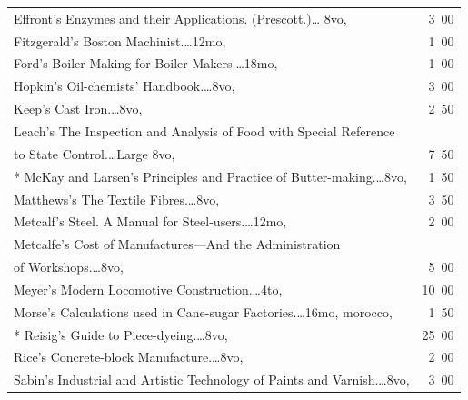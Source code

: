 \documentclass[a4paper,12pt]{book}[2004/02/16]
\theoremstyle{ilemma}
\theoremstyle{itheorem}
\theoremstyle{iother}
\theoremstyle{icorollary}
\theoremstyle{numcorollary}
\theoremstyle{idefinition}
\begin{document}
\begin{longtable}{@{}l@{ }r@{}}
Effront's Enzymes and their Applications. (Prescott.)\dotfill\ldots
8vo, &3\ 00\\

Fitzgerald's Boston Machinist.\dotfill\ldots 12mo, &1\ 00\\

Ford's Boiler Making for Boiler Makers.\dotfill\ldots 18mo, &1\ 00\\

Hopkin's Oil-chemists' Handbook.\dotfill\ldots 8vo, &3\ 00\\

Keep's Cast Iron.\dotfill\ldots 8vo, &2\ 50\\



Leach's The Inspection and Analysis of Food with Special Reference\\

\nopagebreak

\indent\indent to State Control.\dotfill\ldots Large 8vo, &7\ 50\\

* McKay and Larsen's Principles and Practice of
  Butter-making.\dotfill\ldots 8vo, &1\ 50\\

Matthews's The Textile Fibres.\dotfill\ldots 8vo, &3\ 50\\

Metcalf's Steel. A Manual for Steel-users.\dotfill\ldots 12mo, &2\ 00\\

Metcalfe's Cost of Manufactures---And the Administration\\

\nopagebreak

\indent\indent of Workshops.\dotfill\ldots 8vo, &5\ 00\\

Meyer's Modern Locomotive Construction.\dotfill\ldots 4to, &10\ 00\\

Morse's Calculations used in Cane-sugar Factories.\dotfill\ldots 16mo,
morocco, &1\ 50\\

* Reisig's Guide to Piece-dyeing.\dotfill\ldots 8vo, &25\ 00\\

Rice's Concrete-block Manufacture.\dotfill\ldots 8vo, &2\ 00\\

Sabin's Industrial and Artistic Technology of Paints and
Varnish.\dotfill\ldots 8vo, &3\ 00\\


\end{longtable}
\end{document}
